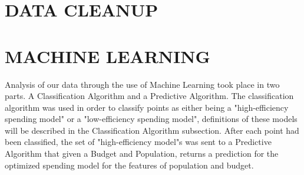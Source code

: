 \documentclass[12pt]{article}
\begin{document}
\begin{multicols}{2}
\section{DATA CLEANUP}

\section{MACHINE LEARNING}
Analysis of our data through the use of Machine Learning took place in two parts. A Classification Algorithm and a Predictive Algorithm. The classification algorithm was used in order to classify points as either being a "high-efficiency spending model" or a "low-efficiency spending model", definitions of these models will be described in the Classification Algorithm subsection. After each point had been classified, the set of "high-efficiency model"s was sent to a Predictive Algorithm that given a Budget and Population, returns a prediction for the optimized spending model for the features of population and budget.

\end{multicols}
\end{document}
